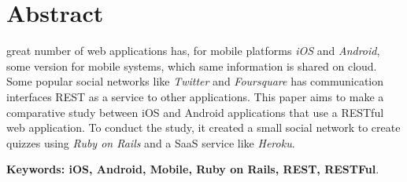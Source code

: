 \chapter*{Abstract}
\label{CHP:ABSTRACT}%
\thispagestyle{empty}


 great number of web applications has, for mobile platforms \emph{iOS} and \emph{Android}, some version for mobile systems, which same information is shared on cloud. Some popular social networks like \emph{Twitter} and \emph{Foursquare} has communication interfaces REST as a service to other applications. This paper aims to make a comparative study between iOS and Android applications that use a RESTful web application. To conduct the study, it created a small social network to create quizzes using \emph{Ruby on Rails} and a SaaS service like \emph{Heroku}.



\noindent \textbf{Keywords: iOS, Android, Mobile, Ruby on Rails, REST, RESTFul}.

